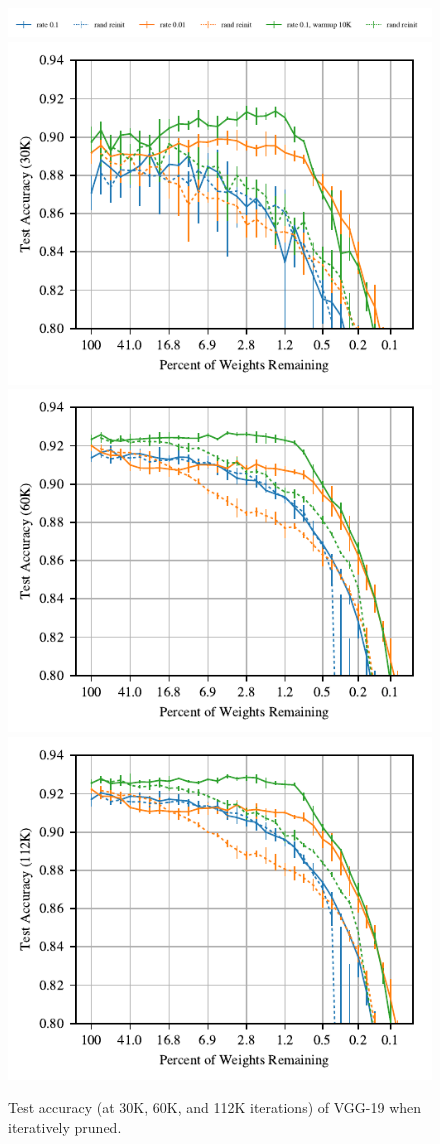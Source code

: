 \begin{figure}
\centering
\vspace{-.5em}
\includegraphics[width=.7\textwidth]{graphs/cifar10/icml/vgg19-iclr-30000/legend}%
\vspace{-1em}
\includegraphics[width=.33\textwidth]{graphs/cifar10/icml/vgg19-iclr-30000/accuracy}%
\includegraphics[width=.33\textwidth]{graphs/cifar10/icml/vgg19-iclr-60000/accuracy}%
\includegraphics[width=.33\textwidth]{graphs/cifar10/icml/vgg19-iclr-112000/accuracy}%
\vspace{-1em}
\caption{Test accuracy (at 30K, 60K, and 112K iterations) of VGG-19 when iteratively pruned.}
\label{fig:vgg}
\end{figure}

